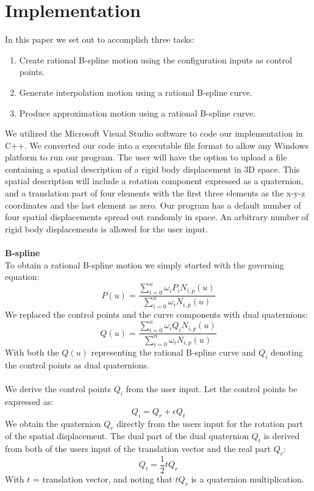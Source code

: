 \documentclass[11pt]{article}
\begin{document}
\section{Implementation}
In this paper we set out to accomplish three tasks:
\begin{enumerate}
  \item Create rational B-spline motion using the configuration inputs as control points.
  \item Generate interpolation motion using a rational B-spline curve.
  \item Produce approximation motion using a rational B-spline curve.
\end{enumerate}
We utilized the Microsoft Visual Studio software to code our implementation in C++. We converted our code into a executable file format to allow any Windows platform to run our program. The user will have the option to upload a file containing a spatial description of a rigid body displacement in 3D space. This spatial description will include a rotation component expressed as a quaternion, and a translation part of four elements with the first three elements as the x-y-z coordinates and the last element as zero. Our program has a default number of four spatial displacements spread out randomly in space.  An arbitrary number of rigid body displacements is allowed for the user input.
\\
\\
\textbf{\large{B-spline}}
\\
To obtain a rational B-spline motion we simply started with the governing equation:
$$ P(u) = \frac{\sum^n_{i=0} \omega_i P_i N_{i,p}(u)}{\sum^n_{i=0} \omega_i N_{i,p}(u)}$$
We replaced the control points and the curve components with dual quaternions:
$$ Q(u) = \frac{\sum^n_{i=0} \omega_i Q_i N_{i,p}(u)}{\sum^n_{i=0} \omega_i N_{i,p}(u)}$$
With both the $Q(u)$ representing the rational B-spline curve and $Q_i$ denoting the control points as dual quaternions.
\\
\\
We derive the control points $Q_i$ from the user input. Let the control points be expressed as:
$$ Q_i = Q_r + \epsilon Q_t $$
We obtain the quaternion $Q_r$ directly from the users input for the rotation part of the spatial displacement. The dual part of the dual quaternion $Q_t$ is derived from both of the users input of the translation vector and the real part $Q_r$:
$$ Q_t = \frac{1}{2}t Q_r $$
With $t$ = translation vector, and noting that $tQ_r$ is a quaternion multiplication.
\\
\end{document}
